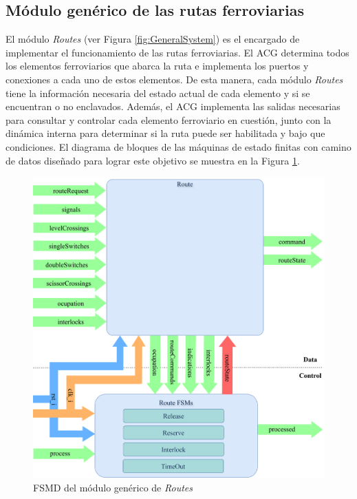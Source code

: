 \subsection{Módulo genérico de las rutas ferroviarias}
	\label{sec:ACG_rts}
	
	El módulo \textit{Routes} (ver Figura \ref{fig:GeneralSystem}) es el encargado de implementar el funcionamiento de las rutas ferroviarias. El ACG determina todos los elementos ferroviarios que abarca la ruta e implementa los puertos y conexiones a cada uno de estos elementos. De esta manera, cada módulo \textit{Routes} tiene la información necesaria del estado actual de cada elemento y si se encuentran o no enclavados. Además, el ACG implementa las salidas necesarias para consultar y controlar cada elemento ferroviario en cuestión, junto con la dinámica interna para determinar si la ruta puede ser habilitada y bajo que condiciones. El diagrama de bloques de las máquinas de estado finitas con camino de datos diseñado para lograr este objetivo se muestra en la Figura \ref{fig:RTS_module}.
	
	\begin{figure}[H]
		\centering
		\includegraphics[width=1\textwidth]{Figuras/RTS_module}
		\centering\caption{FSMD del módulo genérico de \textit{Routes}}
		\label{fig:RTS_module}
	\end{figure}
	
